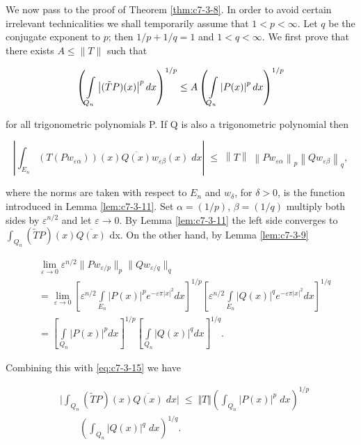 We now pass to the proof of Theorem \ref{thm:c7-3-8}. In order to avoid certain irrelevant technicalities we shall temporarily assume that $1 < p < \infty$. Let $q$ be the conjugate exponent to $p$; then $1/p + 1/q = 1$ and $1 < q < \infty$. We first prove that there exists $A \leq \|T\|$ such that

\begin{equation}\label{eq:c7-3-14}
\left(\intop_{Q_{n}}\left|(\tilde{T}P)(x)\right|^{p}d x\right)^{1/p}\leq A\left(\intop_{Q_{n}}\left|P(x)\right|^{p}d x\right)^{1/p}
\end{equation}

for all trigonometric polynomials P. If Q is also a trigonometric polynomial then

\begin{equation}\label{eq:c7-3-15}
\left|\int_{E_{n}}{(T(P w_{\varepsilon\alpha}))(x)\overline{{Q(x)}}w_{\varepsilon\beta}(x)\;}d x\right|\;\leq\;\left\|T\right\|\;\left\|P w_{\varepsilon\alpha}\right\|_{p}\left\|Q w_{\varepsilon\beta}\right\|_{q},
\end{equation}

where the norms are taken with respect to $E_n$ and $w_\delta$, for $\delta > 0$, is the function introduced in Lemma \ref{lem:c7-3-11}. Set $\alpha = (1/p)$, $\beta = (1/q)$ multiply both sides by $\varepsilon^{n/2}$ and let $\varepsilon \to 0$. By Lemma \ref{lem:c7-3-11} the left side converges to $\int_{Q_n}(\tilde{T}P)(x)\overline{Q(x)}$ dx. On the other hand, by Lemma \ref{lem:c7-3-9}

\[
\begin{aligned}&\lim_{\varepsilon\to0}\varepsilon^{n/2}\big\|P w_{\varepsilon/p}\big\|_{p}\big\|Q w_{\varepsilon/q}\big\|_{q}\\&=\lim_{\varepsilon\to0}\left[\varepsilon^{n/2}\int\limits_{E_{n}}\big|P(x)\big|^{p} e^{-\varepsilon\pi|x|^{2}}dx\right]^{1/p}\left[\varepsilon^{n/2}\int\limits_{E_{n}}\big|Q(x)\big|^{q} e^{-\varepsilon\pi|x|^{2}}dx\right]^{1/q}\\&=\left[\int\limits_{Q_{n}}\big|P(x)\big|^{p} dx\right]^{1/p}\left[\int\limits_{Q_{n}}\big|Q(x)\big|^{q} dx\right]^{1/q}.\end{aligned}
\]

Combining this with \eqref{eq:c7-3-15} we have

\[
\begin{aligned}&\bigg|\int_{Q_{n}}(\widetilde T P)(x)\overline{{Q(x)}}\;d x\bigg|\;\leq\;\Vert T\Vert\left(\int_{Q_{n}}\vert P(x)\vert^{p}\;d x\right)^{1/p}\\&\qquad\left(\int_{Q_{n}}\vert Q(x)\vert^{q}\;d x\right)^{1/q}.\end{aligned}
\]

